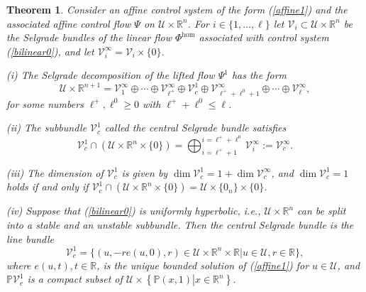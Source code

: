 \documentclass[preprint,12pt]{elsarticle}
\newtheorem{theorem}{Theorem}
\begin{document}
\begin{theorem}
\label{Theorem_Cor32}Consider an affine control system of the form
(\ref{affine1}) and the associated affine control flow $\Psi$ on
$\mathcal{U}\times\mathbb{R}^{n}$. For $i\in\{1,\ldots,\ell\}$ let
$\mathcal{V}_{i}\subset\mathcal{U}\times\mathbb{R}^{n}$ be the Selgrade
bundles of the linear flow $\Phi^{\hom}$ associated with control system
(\ref{bilinear0}), and let $\mathcal{V}_{i}^{\infty}=\mathcal{V}_{i}%
\times\{0\}$.

(i) The Selgrade decomposition of the lifted flow $\Psi^{1}$ has the form
\begin{equation}
\mathcal{U}\times\mathbb{R}^{n+1}=\mathcal{V}_{1}^{\infty}\oplus\cdots
\oplus\mathcal{V}_{\ell^{+}}^{\infty}\oplus\mathcal{V}_{c}^{1}\oplus
\mathcal{V}_{\ell^{+}+\ell^{0}+1}^{\infty}\oplus\cdots\oplus\mathcal{V}_{\ell
}^{\infty}, \label{Sel4}%
\end{equation}
for some numbers $\ell^{+},\ell^{0}\geq0$ with $\ell^{+}+\ell^{0}\leq\ell$.

(ii) The subbundle $\mathcal{V}_{c}^{1}$ called the central Selgrade bundle
satisfies
\[
\mathcal{V}_{c}^{1}\cap\left(  \mathcal{U}\times\mathbb{R}^{n}\times
\{0\}\right)  =\bigoplus_{i=\ell^{+}+1}^{i=\ell^{+}+\ell^{0}}\mathcal{V}%
_{i}^{\infty}:=\mathcal{V}_{c}^{\infty}.
\]


(iii) The dimension of $\mathcal{V}_{c}^{1}$ is given by $\dim\mathcal{V}%
_{c}^{1}=1+\dim\mathcal{V}_{c}^{\infty}$, and $\dim\mathcal{V}_{c}^{1}=1$
holds if and only if $\mathcal{V}_{c}^{1}\cap\left(  \mathcal{U}%
\times\mathbb{R}^{n}\times\{0\}\right)  =\mathcal{U}\times\{0_{n}%
\}\times\{0\}$.

(iv) Suppose that (\ref{bilinear0}) is uniformly hyperbolic, i.e.,
$\mathcal{U}\times\mathbb{R}^{n}$ can be split into a stable and an unstable
subbundle. Then the central Selgrade bundle is the line bundle
\begin{equation}
\mathcal{V}_{c}^{1}=\{(u,-re(u,0),r)\in\mathcal{U}\times\mathbb{R}^{n}%
\times\mathbb{R}\left\vert u\in\mathcal{U},r\in\mathbb{R}\right.  \},
\label{6.7}%
\end{equation}
where $e(u,t),t\in\mathbb{R}$, is the unique bounded solution of
(\ref{affine1}) for $u\in\mathcal{U}$, and $\mathbb{P}\mathcal{V}_{c}^{1}$ is
a compact subset of $\mathcal{U}\times\left\{  \mathbb{P}(x,1)\left\vert
x\in\mathbb{R}^{n}\right.  \right\}  $.
\end{theorem}
\end{document}
